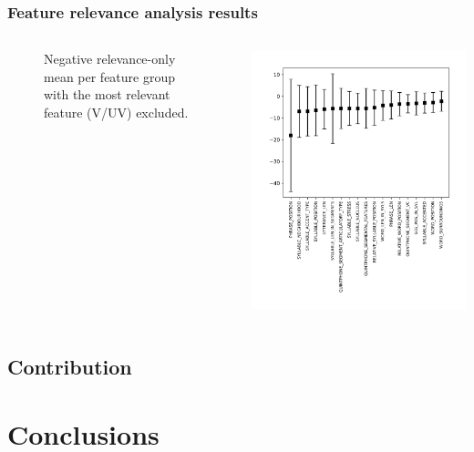 \documentclass[a4paper,9pt]{beamer}
\theoremstyle{mytheoremstyle}
\begin{document}
\begin{frame}
\frametitle{Feature relevance analysis results}
\begin{columns}
\begin{figure}
	\caption{Negative relevance-only mean per feature group with the most relevant feature (V/UV) excluded.}
\end{figure}
\begin{center}
  \includegraphics[width=\textwidth]{res/feature_relevance_ranking_-_mean_(negative_only_sum)_-_general_feature_categories_-_no_vuv}
\end{center}
\end{columns}
\end{frame}

\subsection{Contribution}



\section{Conclusions}
\end{document}
